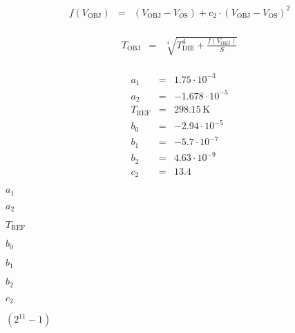 \documentclass{article}
\begin{document}
\begin{eqnarray*} f(V_{\mathrm{OBJ}}) &=& (V_{\mathrm{OBJ}} - V_{O\mathrm{S}}) + c_2 \cdot (V_{\mathrm{OBJ}} - V_{\mathrm{OS}})^2 \\ \end{eqnarray*}
\pagebreak

\begin{eqnarray*} T_{\mathrm{OBJ}} &=& \sqrt[4]{T_{\mathrm{DIE}}^4 + \frac{f(V_{\mathrm{OBJ}})}{S}} \\ \end{eqnarray*}
\pagebreak

\begin{eqnarray*} a_{\mathrm{1}} &=& 1.75 \cdot 10^{-3} \\ a_{\mathrm{2}} &=& -1.678 \cdot 10^{-5} \\ T_{\mathrm{REF}} &=& 298.15\,\mathrm{K} \\ b_{\mathrm{0}} &=& -2.94 \cdot 10^{-5} \\ b_{\mathrm{1}} &=& -5.7 \cdot 10^{-7} \\ b_{\mathrm{2}} &=& 4.63 \cdot 10^{-9} \\ c_{\mathrm{2}} &=& 13.4 \end{eqnarray*}
\pagebreak

$a_{\mathrm{1}}$
\pagebreak

$a_{\mathrm{2}}$
\pagebreak

$T_{\mathrm{REF}}$
\pagebreak

$b_{\mathrm{0}}$
\pagebreak

$b_{\mathrm{1}}$
\pagebreak

$b_{\mathrm{2}}$
\pagebreak

$c_{\mathrm{2}}$
\pagebreak

$ (2^{11} - 1) $
\pagebreak
\end{document}
